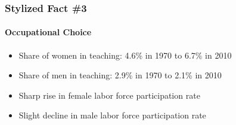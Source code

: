 \documentclass[11pt]{beamer}
\begin{document}
	\begin{frame}
		\frametitle{Stylized Fact \#3}
		\framesubtitle{Occupational Choice}
		\begin{itemize}
			\item Share of women in teaching: 4.6\% in 1970 to 6.7\% in 2010
			\item Share of men in teaching: 2.9\% in 1970 to 2.1\% in 2010
			\item Sharp rise in female labor force participation rate
			\item Slight decline in male labor force participation rate
		\end{itemize}
	\end{frame}
	
	
\end{document}
